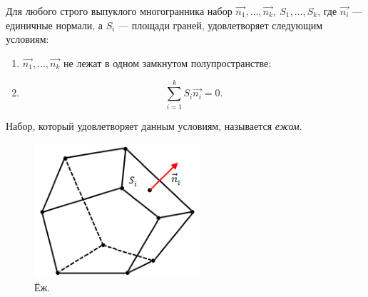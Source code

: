 \begin{statement}
    Для любого строго выпуклого многогранника набор $\overrightarrow{n_1}, \dots, \overrightarrow{n_k}, \ S_1, \dots, S_k$, где $\overrightarrow{n_i}$ — единичные нормали, а $S_i$ — площади граней, удовлетворяет следующим условиям:
    \begin{enumerate}
        \item $\overrightarrow{n_1}, \dots, \overrightarrow{n_k}$ не лежат в одном замкнутом полупространстве;
        \item \[\sum_{i=1}^{k}S_i \overrightarrow{n_i} = 0.\]
    \end{enumerate}
    Набор, который удовлетворяет данным условиям, называется \textit{ежом}.

    \begin{figure}[ht]
        \centering
        \includegraphics[scale=0.8]{images/c7.6.png}
        \caption{Ёж.}
        \label{fig:c7.6}
    \end{figure}
\end{statement}
